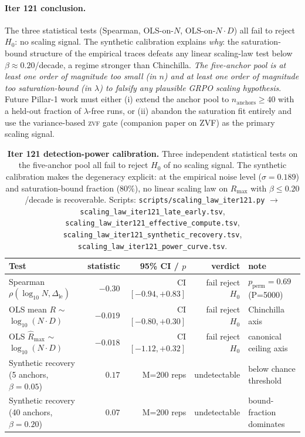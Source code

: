 \documentclass{article}
\begin{document}
\paragraph{Iter 121 conclusion.}
\label{par:scaling-iter121-conclusion}
The three statistical tests (Spearman, OLS-on-$N$, OLS-on-$N \cdot D$)
all fail to reject $H_0$: no scaling signal.  The synthetic
calibration explains \emph{why}: the saturation-bound structure of
the empirical traces defeats any linear scaling-law test below
$\beta \approx 0.20$/decade, a regime stronger than Chinchilla.
\emph{The five-anchor pool is at least one order of magnitude too
small (in $n$) and at least one order of magnitude too
saturation-bound (in $\lambda$) to falsify any plausible GRPO
scaling hypothesis}.  Future Pillar-1 work must either (i) extend
the anchor pool to $n_{\text{anchors}} \ge 40$ with a held-out
fraction of $\lambda$-free runs, or (ii) abandon the saturation
fit entirely and use the variance-based \textsc{zvf} gate
(companion paper on ZVF) as the primary scaling signal.

\begin{table}[t]
  \centering
  \small
  \begin{tabular}{lrrrl}
    \toprule
    Test & statistic & 95\% CI / $p$ & verdict & note \\
    \midrule
    Spearman $\rho(\log_{10}N, \Delta_{\text{le}})$ &
      $-0.30$ & CI $[-0.94, +0.83]$ &
      fail reject $H_0$ & $p_{\text{perm}} = 0.69$ (P=5000) \\
    OLS mean $R$ $\sim$ $\log_{10}(N \cdot D)$ &
      $-0.019$ & CI $[-0.80, +0.30]$ &
      fail reject $H_0$ & Chinchilla axis \\
    OLS $\hat R_{\max}$ $\sim$ $\log_{10}(N \cdot D)$ &
      $-0.018$ & CI $[-1.12, +0.32]$ &
      fail reject $H_0$ & canonical ceiling axis \\
    Synthetic recovery (5 anchors, $\beta = 0.05$) &
      $0.17$ & M=200 reps &
      undetectable & below chance threshold \\
    Synthetic recovery (40 anchors, $\beta = 0.20$) &
      $0.07$ & M=200 reps &
      undetectable & bound-fraction dominates \\
    \bottomrule
  \end{tabular}
  \caption{\textbf{Iter 121 detection-power calibration.}
    Three independent statistical tests on the five-anchor pool
    all fail to reject $H_0$ of no scaling signal.  The synthetic
    calibration makes the degeneracy explicit: at the empirical
    noise level ($\sigma = 0.189$) and saturation-bound fraction
    ($80\%$), no linear scaling law on $R_{\max}$ with
    $\beta \le 0.20$/decade is recoverable.  Scripts:
    \texttt{scripts/scaling\_law\_iter121.py} $\to$
    \texttt{scaling\_law\_iter121\_late\_early.tsv},
    \texttt{scaling\_law\_iter121\_effective\_compute.tsv},
    \texttt{scaling\_law\_iter121\_synthetic\_recovery.tsv},
    \texttt{scaling\_law\_iter121\_power\_curve.tsv}.}
  \label{tab:scaling-iter121}
\end{table}
\end{document}
